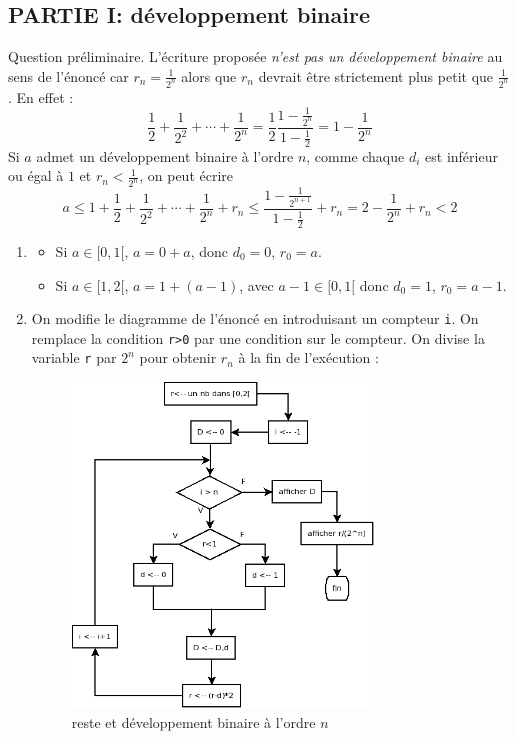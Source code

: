 \subsection*{PARTIE I: développement binaire}
Question préliminaire.\newline
L'écriture proposée \emph{n'est pas un développement binaire} au sens de l'énoncé car $r_n=\frac{1}{2^n}$ alors que $r_n$ devrait être strictement plus petit que $\frac{1}{2^n}$. En effet :
\begin{displaymath}
 \frac{1}{2} + \frac{1}{2^2} + \cdots  + \frac{1}{2^n} =\frac{1}{2}\frac{1-\frac{1}{2^{n}}}{1-\frac{1}{2}}
= 1 - \frac{1}{2^{n}}
\end{displaymath}
Si $a$ admet un développement binaire à l'ordre $n$, comme chaque $d_i$ est inférieur ou égal à $1$ et $r_n<\frac{1}{2^n}$, on peut écrire
\begin{displaymath}
 a \leq 1+\frac{1}{2}+ \frac{1}{2^2}+\cdots+\frac{1}{2^n}+r_n
\leq \frac{1 - \frac{1}{2^{n+1}}}{1-\frac{1}{2}}   +r_n
= 2 - \frac{1}{2^n} +r_n <2
\end{displaymath}
\begin{enumerate}
 \item 
\begin{itemize}
 \item Si $a\in [0,1[$, $a=0+a$, donc $d_0=0$, $r_0=a$. 
 \item Si $a\in [1,2[$, $a=1 + (a-1)$, avec $a-1\in [0,1[$ donc $d_0=1$, $r_0=a-1$.
\end{itemize}

 \item On modifie le diagramme de l'énoncé en introduisant un compteur \verb|i|. On remplace la condition \verb|r>0| par une condition sur le compteur. On divise la variable \verb|r| par $2^n$ pour obtenir $r_n$ à la fin de l'exécution :
\begin{figure}[htp]
 \centering
 \includegraphics[width=8cm]{./Cbincos_1.png}
 \caption{reste et développement binaire à l'ordre $n$}
 \label{fig:Cbincos_1}
\end{figure}
\end{enumerate}


